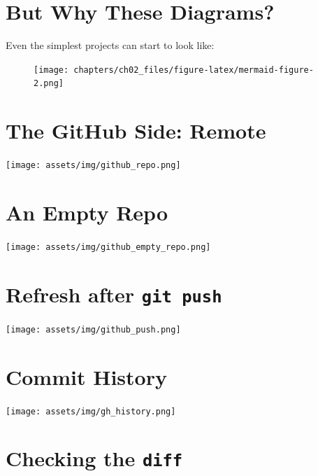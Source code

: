 \documentclass[
  letterpaper,
  DIV=11,
  numbers=noendperiod,
  oneside]{scrreprt}
\begin{document}
\hypertarget{but-why-these-diagrams-1}{%
\section{But Why These Diagrams?}\label{but-why-these-diagrams-1}}

Even the simplest projects can start to look like:

\begin{figure}[H]

{\centering \texttt{[image: chapters/ch02\_files/figure-latex/mermaid-figure-2.png]}

}

\end{figure}

\hypertarget{the-github-side-remote-1}{%
\section{The GitHub Side: Remote}\label{the-github-side-remote-1}}

\texttt{[image: assets/img/github\_repo.png]}

\hypertarget{an-empty-repo-1}{%
\section{An Empty Repo}\label{an-empty-repo-1}}

\texttt{[image: assets/img/github\_empty\_repo.png]}

\hypertarget{refresh-after-git-push-1}{%
\section{\texorpdfstring{Refresh after
\texttt{git\ push}}{Refresh after git push}}\label{refresh-after-git-push-1}}

\texttt{[image: assets/img/github\_push.png]}

\hypertarget{commit-history-1}{%
\section{Commit History}\label{commit-history-1}}

\texttt{[image: assets/img/gh\_history.png]}

\hypertarget{checking-the-diff-1}{%
\section{\texorpdfstring{Checking the
\texttt{diff}}{Checking the diff}}\label{checking-the-diff-1}}
\end{document}
